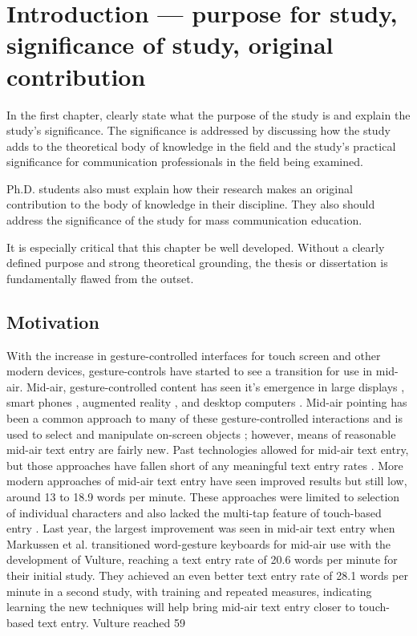 \chapter{Introduction --- purpose for study, significance of study, original contribution}

In the first chapter, clearly state what the purpose of the study is and explain the study's significance. The
significance is addressed by discussing how the study adds to the theoretical body of knowledge in the field and the
study's practical significance for communication professionals in the field being examined.

Ph.D. students also must explain how their research makes an original contribution to the body of
knowledge in their discipline. They also should address the significance of the study for mass communication
education.

It is especially critical that this chapter be well developed. Without a clearly defined purpose and strong
theoretical grounding, the thesis or dissertation is fundamentally flawed from the outset.

\section{Motivation}

With the increase in gesture-controlled interfaces for touch screen and other modern devices, gesture-controls have started to see a transition for use in mid-air. Mid-air, gesture-controlled content has seen it's emergence in large displays \cite{ref10}, smart phones \cite{ref4}, augmented reality \cite{ref12}, and desktop computers \cite{ref15}. Mid-air pointing has been a common approach to many of these gesture-controlled interactions and is used to select and manipulate on-screen objects \cite{ref1,ref2,ref5,ref14,ref18}; however, means of reasonable mid-air text entry are fairly new. Past technologies allowed for mid-air text entry, but those approaches have fallen short of any meaningful text entry rates \cite{ref7}. More modern approaches of mid-air text entry have seen improved results but still low, around 13 \cite{ref8} to 18.9 \cite{ref13} words per minute. These approaches were limited to selection of individual characters and also lacked the multi-tap feature of touch-based entry \cite{ref8,ref11,ref13}. Last year, the largest improvement was seen in mid-air text entry when Markussen et al. \cite{ref9} transitioned word-gesture keyboards for mid-air use with the development of Vulture, reaching a text entry rate of 20.6 words per minute for their initial study. They achieved an even better text entry rate of 28.1 words per minute in a second study, with training and repeated measures, indicating learning the new techniques will help bring mid-air text entry closer to touch-based text entry. Vulture reached 59%

